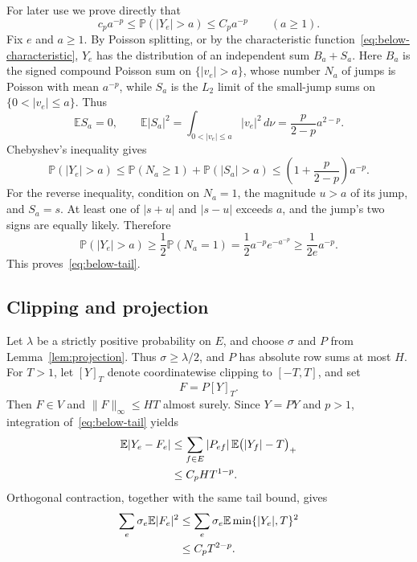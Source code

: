 \documentclass[11pt]{article}
\newcommand{\E}{\mathbb E}
\newcommand{\Prob}{\mathbb P}
\theoremstyle{remark}
\numberwithin{equation}{section}
\begin{document}
For later use we prove directly that
\begin{equation}\label{eq:below-tail}
 c_p a^{-p}\le\Prob(|Y_e|>a)\le C_p a^{-p}
 \qquad(a\ge1).
\end{equation}
Fix $e$ and $a\ge1$. By Poisson splitting, or by the characteristic
function~\eqref{eq:below-characteristic}, $Y_e$ has the distribution
of an independent sum $B_a+S_a$. Here $B_a$ is the signed compound
Poisson sum on $\{|v_e|>a\}$, whose number $N_a$ of jumps is Poisson
with mean $a^{-p}$, while $S_a$ is the $L_2$ limit of the small-jump
sums on $\{0<|v_e|\le a\}$. Thus
\[
 \E S_a=0,
 \qquad
 \E|S_a|^2=\int_{0<|v_e|\le a}|v_e|^2\,d\nu
 =\frac{p}{2-p}a^{2-p}.
\]
Chebyshev's inequality gives
\[
 \Prob(|Y_e|>a)
 \le\Prob(N_a\ge1)+\Prob(|S_a|>a)
 \le\left(1+\frac{p}{2-p}\right)a^{-p}.
\]
For the reverse inequality, condition on $N_a=1$, the magnitude $u>a$
of its jump, and $S_a=s$. At least one of $|s+u|$ and $|s-u|$ exceeds
$a$, and the jump's two signs are equally likely. Therefore
\[
 \Prob(|Y_e|>a)
 \ge\frac12\Prob(N_a=1)
 =\frac12 a^{-p}e^{-a^{-p}}
 \ge\frac{1}{2e}a^{-p}.
\]
This proves~\eqref{eq:below-tail}.

\subsection{Clipping and projection}

Let $\lambda$ be a strictly positive probability on $E$, and choose
$\sigma$ and $P$ from Lemma~\ref{lem:projection}. Thus
$\sigma\ge\lambda/2$, and $P$ has absolute row sums at most $H$.
For $T>1$, let $[Y]_T$ denote coordinatewise clipping
to $[-T,T]$, and set
\[
 F=P[Y]_T.
\]
Then $F\in V$ and $\|F\|_\infty\le HT$ almost surely.
Since $Y=PY$ and $p>1$, integration of~\eqref{eq:below-tail} yields
\begin{align}
 \E|Y_e-F_e|
 &\le\sum_{f\in E}|P_{ef}|\,
             \E\bigl(|Y_f|-T\bigr)_+ \notag\\
 &\le C_p H T^{1-p}.
 \label{eq:below-first-error}
\end{align}
Orthogonal contraction, together with the same tail bound, gives
\begin{align}
 \sum_e\sigma_e\E|F_e|^2
 &\le\sum_e\sigma_e\E\min\{|Y_e|,T\}^2 \notag\\
 &\le C_p T^{2-p}.
 \label{eq:below-second-moment}
\end{align}
\end{document}
